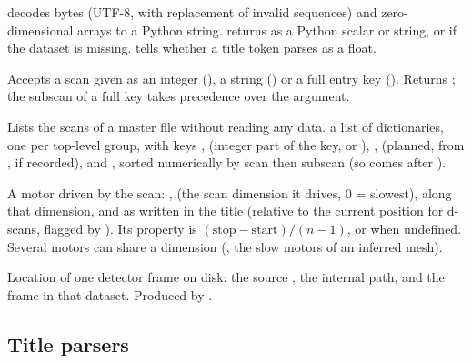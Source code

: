  decodes bytes (UTF-8, with replacement of invalid sequences) and zero-dimensional
arrays to a Python string.  returns  as a Python scalar or
string, or  if the dataset is missing.  tells whether a title token
parses as a float.

Accepts a scan given as an integer (), a string () or a full entry key
(). Returns ; the subscan of a full key takes
precedence over the  argument.

Lists the scans of a master file without reading any data.
 a list of dictionaries, one per top-level group, with keys ,
 (integer part of the key, or ), ,  (planned, from
, if recorded),  and , sorted numerically by
scan then subscan (so  comes after ).

A motor driven by the scan: ,  (the scan dimension it drives, 0 = slowest),
 along that dimension,  and  as written in the title
(relative to the current position for d-scans, flagged by ). Its 
property is $(\text{stop}-\text{start})/(n-1)$, or  when undefined. Several motors can
share a dimension (, the slow motors of an inferred mesh).

Location of one detector frame on disk: the source , the internal 
path, and the frame  in that dataset. Produced by .

\subsection{Title parsers}


